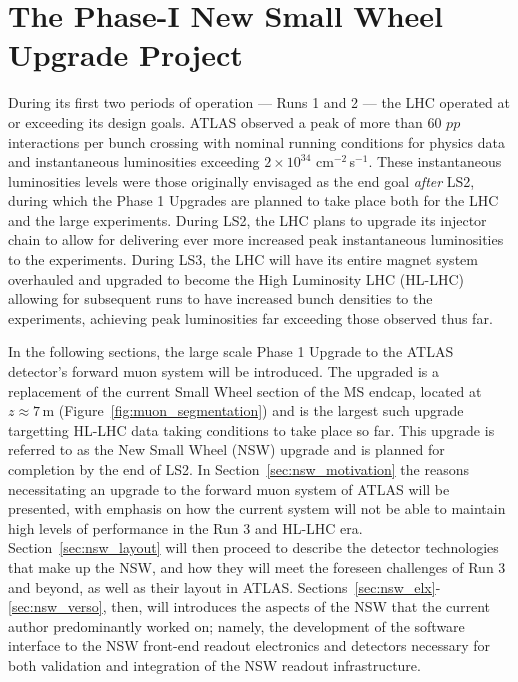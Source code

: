 \chapter{The Phase-I New Small Wheel Upgrade Project}
\label{chap:nsw}

During its first two periods of operation --- Runs 1 and 2 --- the LHC operated
at or exceeding its design goals.
ATLAS observed a peak of more than 60 $pp$ interactions per bunch crossing with nominal running conditions for physics data
and instantaneous luminosities exceeding $2\times 10^{34}$ cm$^{-2}$\,s$^{-1}$.
These instantaneous luminosities levels were those originally envisaged as the end goal \textit{after} LS2,
during which the Phase 1 Upgrades are planned to take place both for the LHC and the large experiments.
During LS2, the LHC plans to upgrade its injector chain to allow for delivering ever
more increased peak instantaneous luminosities to the experiments.
During LS3, the LHC will have its entire magnet system overhauled and upgraded to become the
High Luminosity LHC (HL-LHC) allowing for subsequent runs to have increased bunch densities 
to the experiments, achieving peak luminosities far exceeding those observed thus far.

In the following sections, the large scale Phase 1 Upgrade to the ATLAS detector's forward muon system
will be introduced.
The upgraded is a replacement of the current Small Wheel section of the MS endcap, located at $z \approx 7$\,m (Figure~\ref{fig:muon_segmentation})
and is the largest such upgrade targetting HL-LHC data taking conditions to take place so far.
This upgrade is referred to as the New Small Wheel (NSW) upgrade and is planned for completion by
the end of LS2.
In Section~\ref{sec:nsw_motivation} the reasons necessitating an upgrade to the forward muon system
of ATLAS will be presented, with emphasis on how the current system will not be able to maintain high
levels of performance in the Run 3 and HL-LHC era.
Section~\ref{sec:nsw_layout} will then proceed to describe the detector technologies that make up
the NSW, and how they will meet the foreseen challenges of Run 3 and beyond, as well as their layout
in ATLAS.
Sections~\ref{sec:nsw_elx}-\ref{sec:nsw_verso}, then, will introduces the aspects of the NSW that the
current author predominantly worked on; namely, the development of the software interface to the NSW front-end readout
electronics and detectors necessary for both validation and integration of the NSW readout infrastructure.


